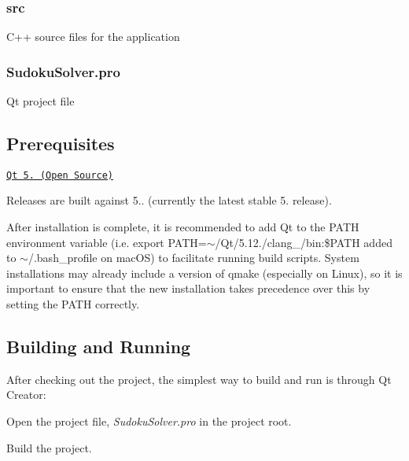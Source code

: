 \subsubsection*{src}


\begin{DoxyItemize}
\item C++ source files for the application
\end{DoxyItemize}

\subsubsection*{Sudoku\+Solver.\+pro}


\begin{DoxyItemize}
\item Qt project file
\end{DoxyItemize}

\subsection*{Prerequisites}


\begin{DoxyItemize}
\item \href{https://www.qt.io/download}{\tt Qt 5. (Open Source)}
\begin{DoxyItemize}
\item Releases are built against 5.. (currently the latest stable 5. release).
\item After installation is complete, it is recommended to add Qt to the P\+A\+TH environment variable (i.\+e. {\ttfamily export P\+A\+TH=$\sim$/\+Qt/5.12./clang\+\_/bin\+:\$\+P\+A\+TH} added to {\ttfamily $\sim$/.bash\+\_\+profile} on mac\+OS) to facilitate running build scripts. System installations may already include a version of {\ttfamily qmake} (especially on Linux), so it is important to ensure that the new installation takes precedence over this by setting the P\+A\+TH correctly.
\end{DoxyItemize}
\end{DoxyItemize}

\subsection*{Building and Running}

After checking out the project, the simplest way to build and run is through Qt Creator\+:


\begin{DoxyEnumerate}
\item Open the project file, {\itshape Sudoku\+Solver.\+pro} in the project root.
\item Build the project.
\end{DoxyEnumerate}

